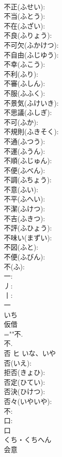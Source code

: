\documentclass[8pt]{extreport}
\begin{document}
\begin{CJK}{UTF8}{min}
\\	不正(ふせい): 
\\	不当(ふとう): 
\\	不在(ふざい): 
\\	不良(ふりょう): 
\\	不可欠(ふかけつ): 
\\	不自由(ふじゆう): 
\\	不幸(ふこう): 
\\	不利(ふり): 
\\	不審(ふしん): 
\\	不服(ふふく): 
\\	不景気(ふけいき): 
\\	不思議(ふしぎ): 
\\	不可(ふか): 
\\	不規則(ふきそく): 
\\	不通(ふつう): 
\\	不運(ふうん): 
\\	不順(ふじゅん): 
\\	不便(ふべん): 
\\	不調(ふちょう): 
\\	不意(ふい): 
\\	不平(ふへい): 
\\	不潔(ふけつ): 
\\	不吉(ふきつ): 
\\	不評(ふひょう): 
\\	不味い(まずい): 
\\	不図(ふと): 
\\	不便(ふびん): 
\\	不(ふ): 
\\	一: 
\\	丿: 
\\	丨: 
\\	一	
\\	いち	
\\	仮借 
\\	=""不.
\\	不.
\\	否	ヒ	いな、いや		
\\	否(いえ): 
\\	拒否(きょひ): 
\\	否定(ひてい): 
\\	否決(ひけつ): 
\\	否々(いやいや): 
\\	不: 
\\	口: 
\\	口	
\\	くち・くちへん	
\\	会意 

\end{CJK}
\end{document}
